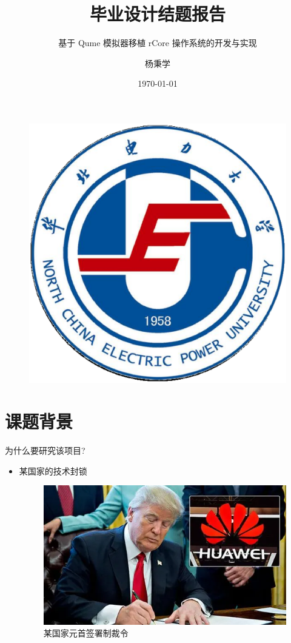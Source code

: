 \documentclass{beamer}
\author{杨秉学}
\title{毕业设计结题报告}
\subtitle{基于 Qume 模拟器移植 rCore 操作系统的开发与实现}
\institute{华北电力大学控制与计算机工程学院}
\date{\today}
\begin{document}
\kaishu
\begin{frame}
	\titlepage
	\begin{figure}[htpb]
		\begin{center}
        \includegraphics[width=0.2\linewidth]{pic/Ncepu_University_Logo.eps}
		\end{center}
	\end{figure}
\end{frame}
\begin{frame}
\tableofcontents[sectionstyle=show,subsectionstyle=show/shaded/hide,subsubsectionstyle=show/shaded/hide]
\end{frame}


\section{课题背景}

\begin{frame}{为什么要研究该项目?}
\begin{itemize}
\item 某国家的技术封锁
    \begin{figure}
        \centering
        \includegraphics[height=0.6\textheight]{pic/trump_huawei.png}
        \caption{某国家元首签署制裁令}
    \end{figure}
\end{itemize}
\end{frame}
\end{document}

